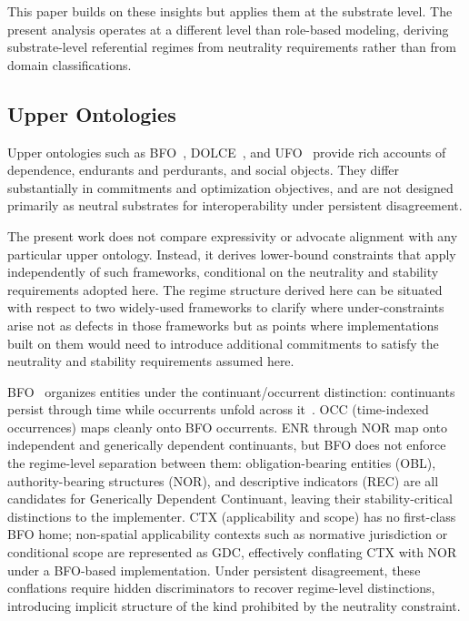 This paper builds on these insights but applies them at the substrate level.
The present analysis operates at a different level than role-based modeling,
deriving substrate-level referential regimes
from neutrality requirements rather than from domain classifications.

\subsection{Upper Ontologies}

Upper ontologies such as BFO~\citep{smith2015basic}, DOLCE~\citep{gangemi2002dolce},
and UFO~\citep{guizzardi2005ontological} provide rich accounts of dependence,
endurants and perdurants, and social objects.
They differ substantially in commitments and optimization objectives, and
are not designed primarily as neutral substrates for interoperability under
persistent disagreement.

The present work does not compare expressivity or advocate alignment with any
particular upper ontology.
Instead, it derives lower-bound constraints that apply independently of such
frameworks, conditional on the neutrality and stability requirements adopted here.
The regime structure derived here can be situated with respect to two
widely-used frameworks to clarify where under-constraints arise
not as defects in those frameworks but as points where implementations
built on them would need to introduce additional commitments
to satisfy the neutrality and stability requirements assumed here.

BFO~\citep{smith2015basic} organizes entities under the
continuant/occurrent distinction:
continuants persist through time
while occurrents unfold across it~\citep{arp2015building}.
OCC (time-indexed occurrences) maps cleanly onto BFO occurrents.
ENR through NOR map onto independent and generically dependent continuants,
but BFO does not enforce the regime-level separation between them:
obligation-bearing entities (OBL), authority-bearing structures (NOR),
and descriptive indicators (REC) are all candidates for
Generically Dependent Continuant, leaving their
stability-critical distinctions to the implementer.
CTX (applicability and scope) has no first-class BFO home;
non-spatial applicability contexts such as normative jurisdiction
or conditional scope are represented as GDC, effectively
conflating CTX with NOR under a BFO-based implementation.
Under persistent disagreement, these conflations require
hidden discriminators to recover regime-level distinctions,
introducing implicit structure of the kind
prohibited by the neutrality constraint.

